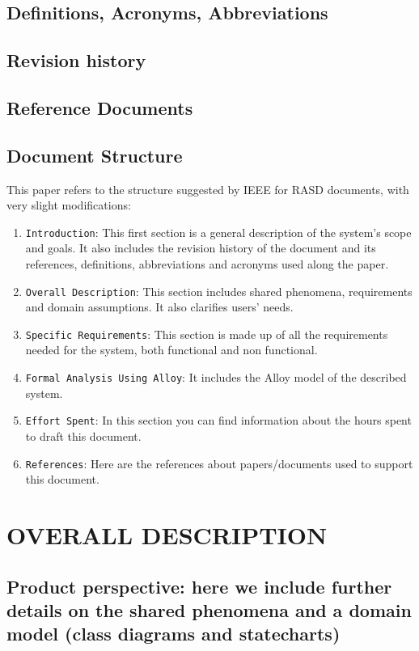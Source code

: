 \documentclass[12pt,a4paper]{article}
\begin{document}
\subsection{Definitions, Acronyms, Abbreviations} 
\subsection{Revision history} 
\subsection{Reference Documents} 
\subsection{Document Structure} 
	This paper refers to the structure suggested by IEEE for RASD documents, with very slight modifications:
		\begin{enumerate}
			\item \texttt{Introduction}: This first section is a general description of the system's scope and goals. It also includes the revision history of the document and its references, definitions, abbreviations and acronyms used along the paper.
			\item \texttt{Overall Description}: This section includes shared phenomena, requirements and domain assumptions. It also clarifies users' needs.
			\item \texttt{Specific Requirements}: This section is made up of all the requirements needed for the system, both functional and non functional.
			\item \texttt{Formal Analysis Using Alloy}: It includes the Alloy model of the described system.
			\item \texttt{Effort Spent}: In this section you can find information about the hours spent to draft this document.
			\item \texttt{References}: Here are the references about papers/documents used to support this document.
		\end{enumerate}
\section{OVERALL DESCRIPTION}
\subsection{Product perspective: here we include  further details on the shared phenomena and a 
domain model (class diagrams and statecharts)} 
\end{document}
